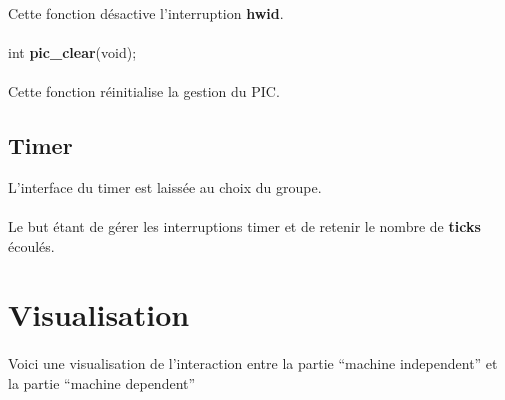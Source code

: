 \documentclass[10pt,a4wide]{article}
\begin{document}
\paragraph{}

Cette fonction d\'esactive l'interruption \textbf{hwid}.

\paragraph{}

\hspace{1.5cm}int \textbf{pic\_clear}(void);

\paragraph{}

Cette fonction r\'einitialise la gestion du PIC.

\subsection{Timer}

L'interface du timer est laiss\'ee au choix du groupe.

\paragraph{}

Le but \'etant de g\'erer les interruptions timer et de retenir le nombre
de \textbf{ticks} \'ecoul\'es.

\newpage

\section{Visualisation}

\paragraph{}

Voici une visualisation de l'interaction entre la partie
``machine independent'' et la partie ``machine dependent''
\end{document}
